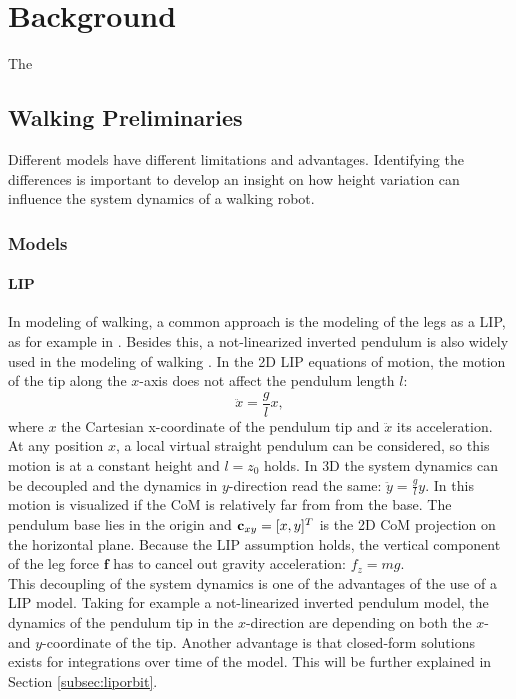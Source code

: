 %
\chapter{Background}
The 
\section{Walking Preliminaries}
Different models have different limitations and advantages. Identifying the differences is important to develop an insight on how height variation can influence the system dynamics of a walking robot.
\subsection{Models}
\subsubsection{LIP}
In modeling of walking, a common approach is the modeling of the legs as a \acf{LIP}, as for example in \cite{kajita20013d}. Besides this, a not-linearized inverted pendulum is also widely used in the modeling of walking \cite{kuo2005energetic}.
In the \ac{2D} \ac{LIP} equations of motion, the motion of the tip along the $x$-axis does not affect the pendulum length $l$:
\begin{equation}
\ddot{x}=\frac{g}{l}x,
\label{eq:LIPeom}
\end{equation}
where $x$ the Cartesian x-coordinate of the pendulum tip and $\ddot{x}$ its acceleration.  At any position $x$, a local virtual straight pendulum can be considered, so this motion is at a constant height and $l=z_0$  holds. In \ac{3D} the system dynamics can be decoupled and the dynamics in $y$-direction read the same: $\ddot{y}=\frac{g}{l} y$. In  this motion is visualized if the \ac{CoM} is relatively far from from the base. The pendulum base lies in the origin and $\mathbf{c}_{xy} = [x,y]^T$ is the \ac{2D} \ac{CoM} projection on the horizontal plane. Because the \ac{LIP} assumption holds, the vertical component of the leg force $\boldsymbol{f}$ has to cancel out gravity acceleration: $f_z=mg$.\\
This decoupling of the system dynamics is one of the advantages of the use of a \ac{LIP} model. Taking for example a not-linearized inverted pendulum model, the dynamics of the pendulum tip in the $x$-direction are depending on both the $x$- and $y$-coordinate of the tip. Another advantage is that closed-form solutions exists for integrations over time of the model. This will be further explained in Section \ref{subsec:liporbit}.\\
